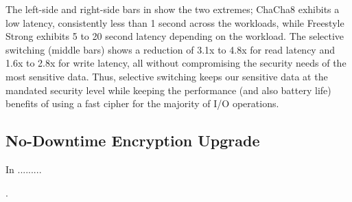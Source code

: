 

The left-side and right-side bars in  show the two
extremes; ChaCha8 exhibits a low latency, consistently less than 1 second
across the workloads, while Freestyle Strong exhibits 5 to 20 second
latency depending on the workload.  The selective switching (middle bars)
shows a reduction of 3.1x to 4.8x for read latency and 1.6x to 2.8x for
write latency, all without compromising the security needs of the most
sensitive data.  Thus, selective switching keeps our sensitive data at the
mandated security level while keeping the performance (and also battery
life) benefits of using a fast cipher for the majority of I/O operations.



\subsection{No-Downtime Encryption Upgrade} 
\label{subsec:uc3}




In  .........

.

